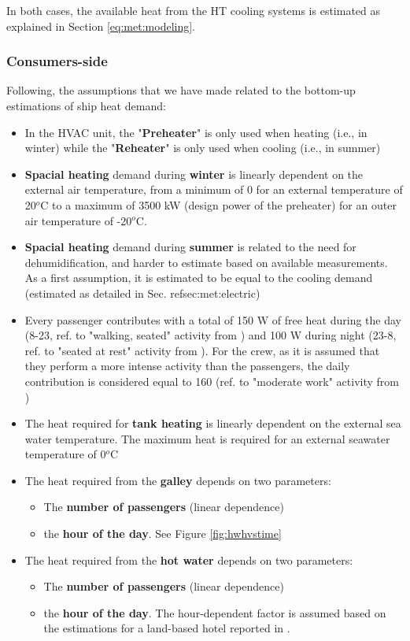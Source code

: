 \documentclass[preprint,12pt]{elsarticle}
\begin{document}
In both cases, the available heat from the HT cooling systems is estimated as explained in Section \ref{eq:met:modeling}.



\subsubsection*{Consumers-side}
Following, the assumptions that we have made related to the bottom-up estimations of ship heat demand:
\begin{itemize}
	\item In the HVAC unit, the "\textbf{Preheater}" is only used when heating (i.e., in winter) while the "\textbf{Reheater}" is only used when cooling (i.e., in summer)
	\item \textbf{Spacial heating} demand during \textbf{winter} is linearly dependent on the external air temperature, from a minimum of 0 for an external temperature of 20$^o$C to a maximum of 3500 kW (design power of the preheater)  for an outer air temperature of -20$^o$C.
	\item \textbf{Spacial heating} demand during \textbf{summer} is related to the need for dehumidification, and harder to estimate based on available measurements. As a first assumption, it is estimated to be equal to the cooling demand (estimated as detailed in Sec. ref{sec:met:electric})
	\item Every passenger contributes with a total of 150 W of free heat during the day (8-23, ref. to "walking, seated" activity from \cite{Wang2000}) and 100 W during night (23-8, ref. to "seated at rest" activity from \cite{Wang2000}). For the crew, as it is assumed that they perform a more intense activity than the passengers, the daily contribution is considered equal to 160 (ref. to "moderate work" activity from \cite{Wang2000}) 
	\item The heat required for \textbf{tank heating} is linearly dependent on the external sea water temperature. The maximum heat is required for an external seawater temperature of 0$^o$C
	\item The heat required from the \textbf{galley} depends on two parameters:
	\begin{itemize}
		\item The \textbf{number of passengers} (linear dependence)
		\item the \textbf{hour of the day}. See Figure \ref{fig:hwhvstime}
	\end{itemize}
	\item The heat required from the \textbf{hot water} depends on two parameters:
	\begin{itemize}
		\item The \textbf{number of passengers} (linear dependence)
		\item the \textbf{hour of the day}. The hour-dependent factor is assumed based on the estimations for a land-based hotel reported in \cite{Chung2015}.
	\end{itemize}   
\end{itemize}
\end{document}
